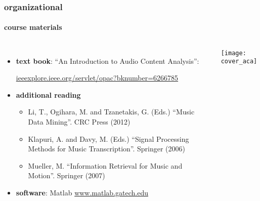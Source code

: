         \begin{frame}\frametitle{organizational}\framesubtitle{course materials}
            \begin{columns}
                    \begin{itemize}
                        \item   \textbf{text book}: ``An Introduction to Audio Content Analysis'':
                        
                            \url{ieeexplore.ieee.org/servlet/opac?bknumber=6266785}

                        \smallskip
                        \item<2->  \textbf{additional reading}
                            \begin{itemize}
                                \item   Li, T., Ogihara, M. and Tzanetakis, G.  (Eds.) ``Music Data Mining''. CRC Press (2012)
                                \item   Klapuri, A. and Davy, M. (Eds.) ``Signal Processing Methods for Music Transcription''. Springer (2006)
                                \item   Mueller, M. ``Information Retrieval for Music and Motion''. Springer (2007)
                            \end{itemize}

                        \smallskip
                        \item<3->   \textbf{software}: Matlab
                            \url{www.matlab.gatech.edu}
                    \end{itemize}
                    \texttt{[image: cover\_aca]}
                    \vspace{40mm}
             \end{columns}
       \end{frame}

